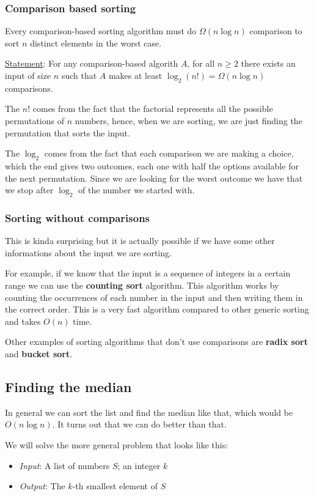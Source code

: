 \documentclass[10pt]{extarticle}
\begin{document}
\subsubsection{Comparison based sorting}

Every comparison-based sorting algorithm
must do $\Omega(n \log n)$ comparison to sort $n$ distinct elements in the worst case.

\underline{Statement}: For any comparison-based algorith $A$, for all $n \ge 2$ there exists an input of size $n$
such that $A$ makes at least $\log_2(n!) = \Omega(n \log n)$ comparisons.

The $n!$ comes from the fact that the factorial represents all the possible permutations of $n$ numbers,
hence, when we are sorting, we are just finding the  permutation that sorts the input.

The $\log_2$ comes from the fact that each comparison we are making a choice, which the end gives two outcomes,
each one with half the options available for the next permutation.
Since we are looking for the worst outcome we have that we stop after $\log_2$ of the number we started with.

\subsubsection{Sorting without comparisons}

This is kinda surprising but it is actually possible if we have some other informations about the input we are sorting.

For example, if we know that the input is a sequence of integers in a certain range we can use the \textbf{counting sort} algorithm.
This algorithm works by counting the occurrences of each number in the input and then writing them in the correct order.
This is a very fast algorithm compared to other generic sorting and takes $O(n)$ time.

Other examples of sorting algorithms that don't use comparisons are \textbf{radix sort} and \textbf{bucket sort}.

\subsection{Finding the median}

In general we can sort the list and find the median like that, which would be $O(n \log n)$.
It turns out that we can do better than that.

We will solve the more general problem that looks like this:
\begin{itemize}
    \item \textit{Input}: A list of numbers $S$; an integer $k$
    \item \textit{Output}: The $k$-th smallest element of $S$
\end{itemize}
\end{document}
